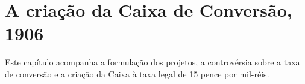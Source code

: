 \chapter{A criação da Caixa de Conversão, 1906}

Este capítulo acompanha a formulação dos projetos, a controvérsia sobre a taxa de conversão e a criação da Caixa à taxa legal de 15 pence por mil-réis.



